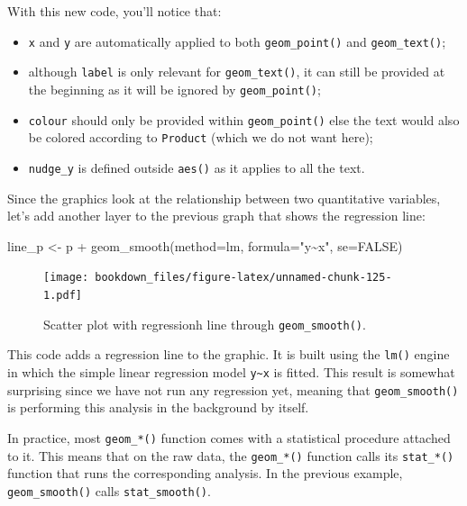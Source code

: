 \documentclass[
]{krantz}
\makeatletter
\newenvironment{Shaded}{\begin{snugshade}}{\end{snugshade}}
\newcommand{\AttributeTok}[1]{\textcolor[rgb]{0.61,0.61,0.61}{#1}}
\newcommand{\ConstantTok}[1]{\textcolor[rgb]{0,0,0}{#1}}
\newcommand{\FunctionTok}[1]{\textcolor[rgb]{0,0,0}{#1}}
\newcommand{\NormalTok}[1]{#1}
\newcommand{\OtherTok}[1]{\textcolor[rgb]{0.37,0.37,0.37}{#1}}
\newcommand{\SpecialCharTok}[1]{\textcolor[rgb]{0,0,0}{#1}}
\newcommand{\StringTok}[1]{\textcolor[rgb]{0.5,0.5,0.5}{#1}}
\providecommand{\tightlist}{%
  \setlength{\itemsep}{0pt}\setlength{\parskip}{0pt}}
\newenvironment{kframe}{%
\medskip{}
\setlength{\fboxsep}{.8em}
 \def\at@end@of@kframe{}%
 \ifinner\ifhmode%
  \def\at@end@of@kframe{\end{minipage}}%
  \begin{minipage}{\columnwidth}%
 \fi\fi%
 \def\FrameCommand##1{\hskip\@totalleftmargin \hskip-\fboxsep
 \colorbox{shadecolor}{##1}\hskip-\fboxsep
     \hskip-\linewidth \hskip-\@totalleftmargin \hskip\columnwidth}%
 \MakeFramed {\advance\hsize-\width
   \@totalleftmargin\z@ \linewidth\hsize
   \@setminipage}}%
 {\par\unskip\endMakeFramed%
 \at@end@of@kframe}
\renewenvironment{Shaded}{\begin{kframe}}{\end{kframe}}
\makeatother
\begin{document}
With this new code, you'll notice that:

\begin{itemize}
\tightlist
\item
  \texttt{x} and \texttt{y} are automatically applied to both \texttt{geom\_point()} and \texttt{geom\_text()};
\item
  although \texttt{label} is only relevant for \texttt{geom\_text()}, it can still be provided at the beginning as it will be ignored by \texttt{geom\_point()};
\item
  \texttt{colour} should only be provided within \texttt{geom\_point()} else the text would also be colored according to \texttt{Product} (which we do not want here);
\item
  \texttt{nudge\_y} is defined outside \texttt{aes()} as it applies to all the text.
\end{itemize}

Since the graphics look at the relationship between two quantitative variables, let's add another layer to the previous graph that shows the regression line:

\begin{Shaded}
\begin{Highlighting}[]
\NormalTok{line\_p }\OtherTok{\textless{}{-}}\NormalTok{ p }\SpecialCharTok{+}
  \FunctionTok{geom\_smooth}\NormalTok{(}\AttributeTok{method=}\NormalTok{lm, }\AttributeTok{formula=}\StringTok{"y\textasciitilde{}x"}\NormalTok{, }\AttributeTok{se=}\ConstantTok{FALSE}\NormalTok{)}
\end{Highlighting}
\end{Shaded}

\begin{figure}
\centering
\texttt{[image: bookdown\_files/figure-latex/unnamed-chunk-125-1.pdf]}
\caption{\label{fig:unnamed-chunk-125}Scatter plot with regressionh line through \texttt{geom\_smooth()}.}
\end{figure}

This code adds a regression line to the graphic. It is built using the \texttt{lm()} engine in which the simple linear regression model \texttt{y\textasciitilde{}x} is fitted. This result is somewhat surprising since we have not run any regression yet, meaning that \texttt{geom\_smooth()} is performing this analysis in the background by itself.

In practice, most \texttt{geom\_*()} function comes with a statistical procedure attached to it. This means that on the raw data, the \texttt{geom\_*()} function calls its \texttt{stat\_*()} function that runs the corresponding analysis. In the previous example, \texttt{geom\_smooth()} calls \texttt{stat\_smooth()}.
\end{document}
